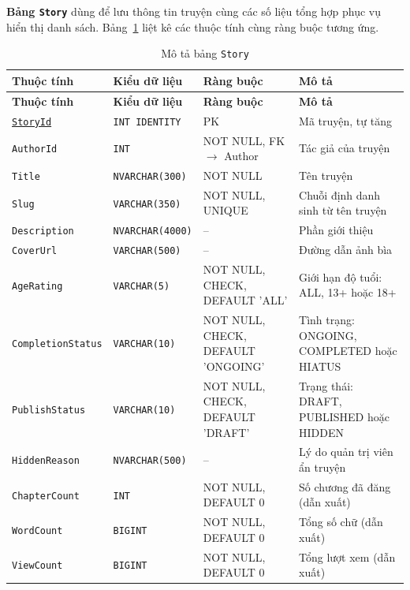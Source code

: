 \textbf{Bảng \texttt{Story}} dùng để lưu thông tin truyện cùng các số liệu tổng hợp phục vụ hiển thị danh sách. Bảng~\ref{tab:db-story} liệt kê các thuộc tính cùng ràng buộc tương ứng.


{\small
\renewcommand{\arraystretch}{1.2}
\begin{longtable}{|>{\raggedright\arraybackslash}p{3.1cm}|>{\raggedright\arraybackslash}p{2.7cm}|>{\raggedright\arraybackslash}p{4.0cm}|>{\raggedright\arraybackslash}p{5.4cm}|}
\caption{Mô tả bảng \texttt{Story}}\label{tab:db-story}\\
\hline
\textbf{Thuộc tính} & \textbf{Kiểu dữ liệu} & \textbf{Ràng buộc} & \textbf{Mô tả} \\ \hline
\endfirsthead
\hline
\textbf{Thuộc tính} & \textbf{Kiểu dữ liệu} & \textbf{Ràng buộc} & \textbf{Mô tả} \\ \hline
\endhead
\underline{\texttt{StoryId}} & \texttt{INT IDENTITY} & PK & Mã truyện, tự tăng \\ \hline
\texttt{AuthorId} & \texttt{INT} & NOT NULL, FK $\rightarrow$ Author & Tác giả của truyện \\ \hline
\texttt{Title} & \texttt{NVARCHAR(300)} & NOT NULL & Tên truyện \\ \hline
\texttt{Slug} & \texttt{VARCHAR(350)} & NOT NULL, UNIQUE & Chuỗi định danh sinh từ tên truyện \\ \hline
\texttt{Description} & \texttt{NVARCHAR(4000)} & -- & Phần giới thiệu \\ \hline
\texttt{CoverUrl} & \texttt{VARCHAR(500)} & -- & Đường dẫn ảnh bìa \\ \hline
\texttt{AgeRating} & \texttt{VARCHAR(5)} & NOT NULL, CHECK, DEFAULT 'ALL' & Giới hạn độ tuổi: ALL, 13+ hoặc 18+ \\ \hline
\texttt{CompletionStatus} & \texttt{VARCHAR(10)} & NOT NULL, CHECK, DEFAULT 'ONGOING' & Tình trạng: ONGOING, COMPLETED hoặc HIATUS \\ \hline
\texttt{PublishStatus} & \texttt{VARCHAR(10)} & NOT NULL, CHECK, DEFAULT 'DRAFT' & Trạng thái: DRAFT, PUBLISHED hoặc HIDDEN \\ \hline
\texttt{HiddenReason} & \texttt{NVARCHAR(500)} & -- & Lý do quản trị viên ẩn truyện \\ \hline
\texttt{ChapterCount} & \texttt{INT} & NOT NULL, DEFAULT 0 & Số chương đã đăng (dẫn xuất) \\ \hline
\texttt{WordCount} & \texttt{BIGINT} & NOT NULL, DEFAULT 0 & Tổng số chữ (dẫn xuất) \\ \hline
\texttt{ViewCount} & \texttt{BIGINT} & NOT NULL, DEFAULT 0 & Tổng lượt xem (dẫn xuất) \\ \hline

\end{longtable}}

